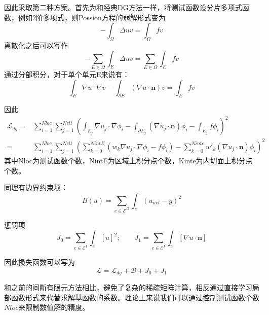 因此采取第二种方案。首先为和经典DG方法一样，将测试函数设分片多项式函数，例如2阶多项式，则Possion方程的弱解形式变为
$$-\int_\Omega \Delta u v = \int_\Omega fv$$
离散化之后可以写作
$$ -\sum_{E\in \Omega}\int_E \Delta u v = \sum_{E\in \Omega}\int_E fv $$
通过分部积分，对于单个单元E来说有：
$$\int_E \nabla u\cdot \nabla v - \int_{\partial E}(\nabla u\cdot \textbf{n})v = \int_E fv$$

因此
$$\begin{aligned}
    \mathcal{L}_{dg} =& \sum_{i=1}^{Nloc}\sum_{j=1}^{Nelt}\left(\int_{E_j} \nabla u_j\cdot \nabla \phi_i - \int_{\partial {E_j}}(\nabla u_j\cdot \textbf{n})\phi_i - \int_{E_j} f\phi_i\right)^2\\
    =&\sum_{i=1}^{Nloc}\sum_{j=1}^{Nelt}\left(\sum_{k=0}^{NintE}\left(w_k \nabla u_j \cdot \nabla \phi_i - f\phi_i\right)-\sum_{k=0}^{Ninte}w'_k(\nabla u_j \cdot \textbf{n})\phi_i\right)^2
\end{aligned}   
$$
其中Nloc为测试函数个数，NintE为区域上积分点个数，Kinte为内切面上积分点个数。

同理有边界约束项：
$$B (u)= \sum_{e\in\mathscr{E}^D}\int_e(u_{net} - g)^2$$

惩罚项
$$J_0 = \sum_{e\in\mathscr{E}^I}\int_{e}[u]^2; \qquad J_1 = \sum_{e\in\mathscr{E}^I}\int_{e}[\nabla u \cdot \textbf{n}]$$

因此损失函数可以写为
$$\mathcal{L} = \mathcal{L}_{dg} + \mathcal{B}+J_0+J_1$$

和之前的间断有限元方法相比，避免了复杂的稀疏矩阵计算，相反通过直接学习局部函数形式来代替求解基函数的系数。理论上来说我们可以通过控制测试函数个数$Nloc$来限制数值解的精度。








